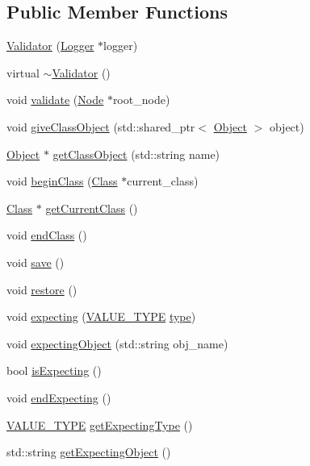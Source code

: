 \subsection*{Public Member Functions}
\begin{DoxyCompactItemize}
\item 
\hyperlink{classValidator_a7c66bc9f7104715da531915186691eb8}{Validator} (\hyperlink{classLogger}{Logger} $\ast$logger)
\item 
virtual \hyperlink{classValidator_a4270e7ebf0c451ff80b4ec6fd8eb6a42}{$\sim$\+Validator} ()
\item 
void \hyperlink{classValidator_aa0bc30458ce0255fcec64d8346e384a5}{validate} (\hyperlink{classNode}{Node} $\ast$root\+\_\+node)
\item 
void \hyperlink{classValidator_ad0a3d5e1c57840006e96c74c74eac0aa}{give\+Class\+Object} (std\+::shared\+\_\+ptr$<$ \hyperlink{classObject}{Object} $>$ object)
\item 
\hyperlink{classObject}{Object} $\ast$ \hyperlink{classValidator_afe99d9833e5cda3ab1aab764ab99d716}{get\+Class\+Object} (std\+::string name)
\item 
void \hyperlink{classValidator_a364835c9dc181485838d083b6f227fdb}{begin\+Class} (\hyperlink{classClass}{Class} $\ast$current\+\_\+class)
\item 
\hyperlink{classClass}{Class} $\ast$ \hyperlink{classValidator_a342833ad81caff452754620d29083a3d}{get\+Current\+Class} ()
\item 
void \hyperlink{classValidator_a1d31142fe2275fbc9556d1164b01cbfb}{end\+Class} ()
\item 
void \hyperlink{classValidator_a055e6bdb84438449655135b9166bcf2d}{save} ()
\item 
void \hyperlink{classValidator_a0c89c0c840be87b9011cb518d7bc12ff}{restore} ()
\item 
void \hyperlink{classValidator_a38479b2cec77382e7c25ce898f4d47f9}{expecting} (\hyperlink{statics_8h_a0674a913b8e8c8a9f265baab3646b565}{V\+A\+L\+U\+E\+\_\+\+T\+Y\+PE} \hyperlink{classSystemHandler_a8ca6090af683e8555051681fd31cd865}{type})
\item 
void \hyperlink{classValidator_a6a88dbc8624b8803408094c16a98c205}{expecting\+Object} (std\+::string obj\+\_\+name)
\item 
bool \hyperlink{classValidator_ab94d9925c577be6a8cad24a5a6b60db9}{is\+Expecting} ()
\item 
void \hyperlink{classValidator_adfa1b750001981ae5daa085d32bd626f}{end\+Expecting} ()
\item 
\hyperlink{statics_8h_a0674a913b8e8c8a9f265baab3646b565}{V\+A\+L\+U\+E\+\_\+\+T\+Y\+PE} \hyperlink{classValidator_a786b6b8a5dc6136bbcb2d012e1d8914b}{get\+Expecting\+Type} ()
\item 
std\+::string \hyperlink{classValidator_aca02c85892f3c74114fa936bad41ff07}{get\+Expecting\+Object} ()
\end{DoxyCompactItemize}
